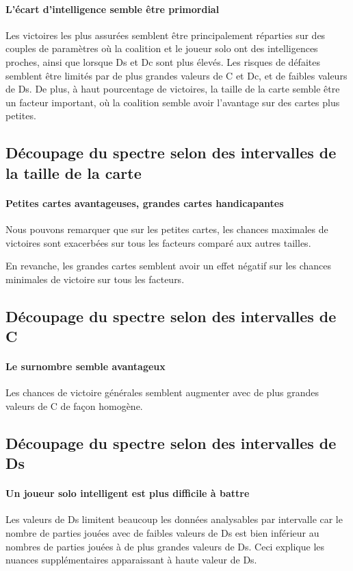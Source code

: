 \paragraph{L'écart d'intelligence semble être primordial}
Les victoires les plus assurées semblent être principalement réparties sur des couples de paramètres où la coalition et le joueur solo ont des intelligences proches, ainsi que lorsque Ds et Dc sont plus élevés.
Les risques de défaites semblent être limités par de plus grandes valeurs de C et Dc, et de faibles valeurs de Ds.
De plus, à haut pourcentage de victoires, la taille de la carte semble être un facteur important, où la coalition semble avoir l'avantage sur des cartes plus petites.


\subsection{Découpage du spectre selon des intervalles de la taille de la carte}
\paragraph{Petites cartes avantageuses, grandes cartes handicapantes}
Nous pouvons remarquer que sur les petites cartes, les chances maximales de victoires sont exacerbées sur tous les facteurs comparé aux autres tailles.

En revanche, les grandes cartes semblent avoir un effet négatif sur les chances minimales de victoire sur tous les facteurs. 

\subsection{Découpage du spectre selon des intervalles de C}
\paragraph{Le surnombre semble avantageux}
Les chances de victoire générales semblent augmenter avec de plus grandes valeurs de C de façon homogène.


\subsection{Découpage du spectre selon des intervalles de Ds}
\paragraph{Un joueur solo intelligent est plus difficile à battre}
Les valeurs de Ds limitent beaucoup les données analysables par intervalle car le nombre de parties jouées avec de faibles valeurs de Ds est bien inférieur au nombres de parties jouées à de plus grandes valeurs de Ds.
Ceci explique les nuances supplémentaires apparaissant à haute valeur de Ds.

